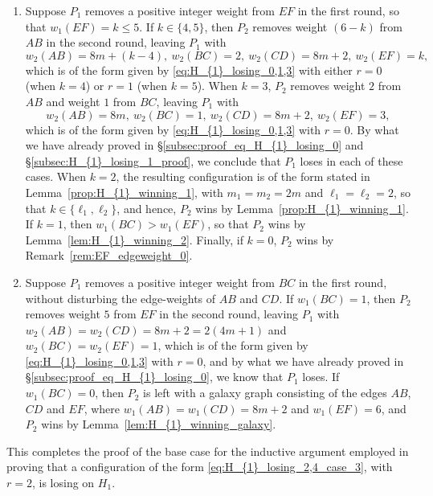 \documentclass[11pt,reqno]{amsart}
\theoremstyle{definition}
\theoremstyle{definition}
\begin{document}
\begin{enumerate}
\item Suppose $P_{1}$ removes a positive integer weight from $EF$ in the first round, so that $w_{1}(EF)=k\leqslant 5$. If $k \in \{4,5\}$, then $P_{2}$ removes weight $(6-k)$ from $AB$ in the second round, leaving $P_{1}$ with
\begin{equation}
w_{2}(AB)=8m+(k-4),\ w_{2}(BC)=2,\ w_{2}(CD)=8m+2,\ w_{2}(EF)=k,\nonumber
\end{equation}
which is of the form given by \eqref{eq:H_{1}_losing_0,1,3} with either $r=0$ (when $k=4$) or $r=1$ (when $k=5$). When $k=3$, $P_{2}$ removes weight $2$ from $AB$ and weight $1$ from $BC$, leaving $P_{1}$ with 
\begin{equation}
w_{2}(AB)=8m,\ w_{2}(BC)=1,\ w_{2}(CD)=8m+2,\ w_{2}(EF)=3,\nonumber
\end{equation}
which is of the form given by \eqref{eq:H_{1}_losing_0,1,3} with $r=0$. By what we have already proved in \S\ref{subsec:proof_eq_H_{1}_losing_0} and \S\ref{subsec:H_{1}_losing_1_proof}, we conclude that $P_{1}$ loses in each of these cases. When $k=2$, the resulting configuration is of the form stated in Lemma~\ref{prop:H_{1}_winning_1}, with $m_{1}=m_{2}=2m$ and $\ell_{1}=\ell_{2}=2$, so that $k \in \{\ell_{1},\ell_{2}\}$, and hence, $P_{2}$ wins by Lemma~\ref{prop:H_{1}_winning_1}. If $k=1$, then $w_{1}(BC)>w_{1}(EF)$, so that $P_{2}$ wins by Lemma~\ref{lem:H_{1}_winning_2}. Finally, if $k=0$, $P_{2}$ wins by Remark~\ref{rem:EF_edgeweight_0}.

\item Suppose $P_{1}$ removes a positive integer weight from $BC$ in the first round, without disturbing the edge-weights of $AB$ and $CD$. If $w_{1}(BC)=1$, then $P_{2}$ removes weight $5$ from $EF$ in the second round, leaving $P_{1}$ with $w_{2}(AB)=w_{2}(CD)=8m+2=2(4m+1)$ and $w_{2}(BC)=w_{2}(EF)=1$, which is of the form given by \eqref{eq:H_{1}_losing_0,1,3} with $r=0$, and by what we have already proved in \S\ref{subsec:proof_eq_H_{1}_losing_0}, we know that $P_{1}$ loses. If $w_{1}(BC)=0$, then $P_{2}$ is left with a galaxy graph consisting of the edges $AB$, $CD$ and $EF$, where $w_{1}(AB)=w_{1}(CD)=8m+2$ and $w_{1}(EF)=6$, and $P_{2}$ wins by Lemma~\ref{lem:H_{1}_winning_galaxy}. 
\end{enumerate}

This completes the proof of the base case for the inductive argument employed in proving that a configuration of the form \eqref{eq:H_{1}_losing_2,4_case_3}, with $r=2$, is losing on $H_{1}$.
\end{document}
